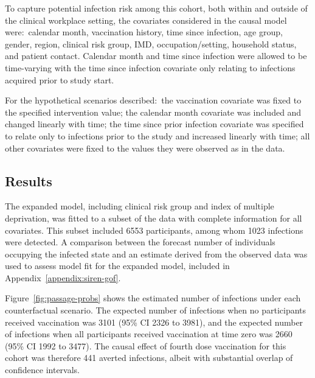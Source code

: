 To capture potential infection risk among this cohort, both within and outside of the clinical workplace setting, the covariates considered in the causal model were:\ calendar month, vaccination history, time since infection, age group, gender, region, clinical risk group, IMD, occupation/setting, household status, and patient contact.  Calendar month and time since infection were allowed to be time-varying with the time since infection covariate only relating to infections acquired prior to study start.

For the hypothetical scenarios described:\ the vaccination covariate was fixed to the specified intervention value; the calendar month covariate was included and changed linearly with time; the time since prior infection covariate was specified to relate only to infections prior to the study and increased linearly with time; all other covariates were fixed to the values they were observed as in the data.

\subsection{Results}

The expanded model, including clinical risk group and index of multiple deprivation, was fitted to a subset of the data with complete information for all covariates. This subset included 6553 participants, among whom 1023 infections were detected. A comparison between the forecast number of individuals occupying the infected state and an estimate derived from the observed data was used to assess model fit for the expanded model, included in Appendix~\ref{appendix:siren-gof}.

Figure~\ref{fig:passage-probs} shows the estimated number of infections under each counterfactual scenario. The expected number of infections when no participants received vaccination was 3101 (95\% CI 2326 to 3981), and the expected number of infections when all participants received vaccination at time zero was 2660 (95\% CI 1992 to 3477). The causal effect of fourth dose vaccination for this cohort was therefore 441 averted infections, albeit with substantial overlap of confidence intervals.

